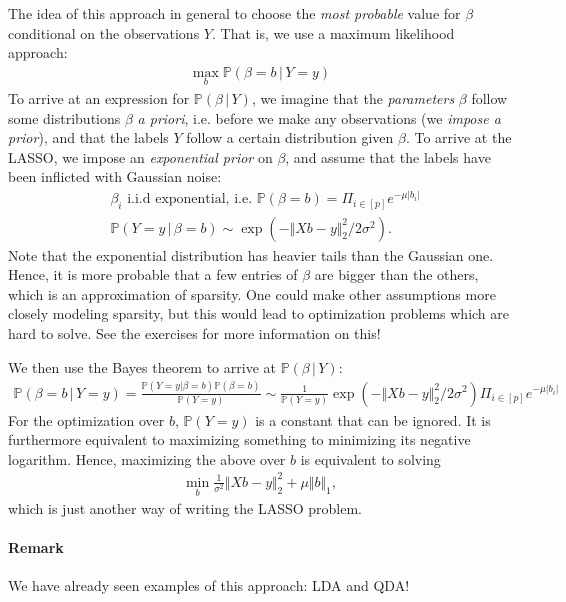 \documentclass{article}
\newcommand{\abs}[1]{\vert #1 \vert}
\newcommand{\norm}[1]{\Vert #1 \Vert}
\begin{document}
The idea of this approach in general to choose the \emph{most probable} value for $\beta$ conditional on the observations $Y$. That is, we use a maximum likelihood approach:
\begin{align*}
    \max_{b} \mathbb{P}(\beta = b \, \vert \,Y=y)
\end{align*}
To arrive at an expression for $\mathbb{P}(\beta \, \vert \, Y)$, we imagine that the \emph{parameters} $\beta$ follow some distributions $\beta$ \emph{a priori}, i.e. before we make any observations (we \emph{impose a prior}), and that the labels $Y$ follow a certain distribution given $\beta$. To arrive at the LASSO, we impose an \emph{exponential prior} on $\beta$, and assume that the labels have been inflicted with Gaussian noise:
\begin{align}
    &\beta_i \text{ i.i.d exponential, i.e. } \mathbb{P}(\beta = b) = \Pi_{i\in [p]}e^{-\mu\abs{b_i}} \\
    &\mathbb{P}(Y=y\, \vert \, \beta=b) \sim \exp(-\norm{Xb-y}^2_2/2\sigma^2).
\end{align}
Note that the exponential distribution has heavier tails than the Gaussian one. Hence, it is more probable that a few entries of $\beta$ are bigger than the others, which is an approximation of sparsity. One could make other assumptions more closely modeling sparsity, but this would lead to optimization problems which are hard to solve. See the exercises for more information on this!

We then use the Bayes theorem to arrive at $\mathbb{P}(\beta \, \vert \, Y)$:
\begin{align*}
     \mathbb{P}(\beta =b\, \vert \, Y=y) = \frac{\mathbb{P}(Y =y\vert \beta=b)\mathbb{P}(\beta=b)}{\mathbb{P}(Y=y)} \sim \frac{1}{\mathbb{P}(Y=y)}  \exp(-\norm{Xb-y}^2_2/2\sigma^2)\Pi_{i\in [p]}e^{-\mu\abs{b_i}}
\end{align*}
For the optimization over $b$, $\mathbb{P}(Y=y)$ is a constant that can be ignored. It is furthermore equivalent to maximizing something to minimizing its negative logarithm. Hence, maximizing the above over $b$ is equivalent to solving
\begin{align*}
    \min_{b}\tfrac{1}{\sigma^2} \norm{Xb-y}_2^2 + \mu\norm{b}_1,
\end{align*}
which is just another way of writing the LASSO problem.

\paragraph{Remark} We have already seen examples of this approach: LDA and QDA!
\end{document}
